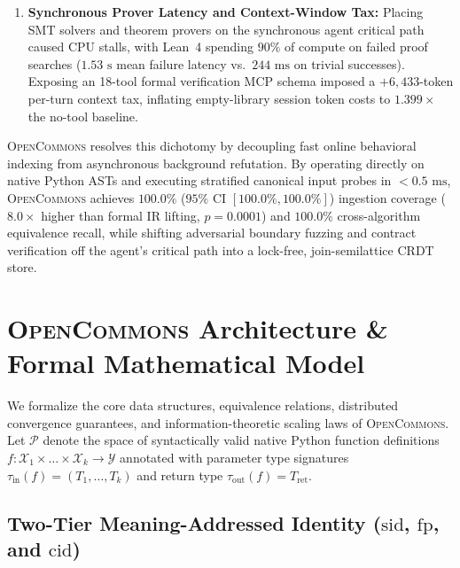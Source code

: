\documentclass[10pt,twocolumn]{article}
\begin{document}
\begin{enumerate}
    \item \textbf{Synchronous Prover Latency and Context-Window Tax:} Placing SMT solvers and theorem provers on the synchronous agent critical path caused CPU stalls, with Lean~4 spending $90\%$ of compute on failed proof searches ($1.53\text{ s}$ mean failure latency vs.\ $244\text{ ms}$ on trivial successes). Exposing an 18-tool formal verification MCP schema imposed a $+6{,}433$-token per-turn context tax, inflating empty-library session token costs to $1.399\times$ the no-tool baseline.
\end{enumerate}

\textsc{OpenCommons} resolves this dichotomy by decoupling fast online behavioral indexing from asynchronous background refutation. By operating directly on native Python ASTs and executing stratified canonical input probes in $<0.5\text{ ms}$, \textsc{OpenCommons} achieves $100.0\%$ ($95\%$ CI $[100.0\%, 100.0\%]$) ingestion coverage ($8.0\times$ higher than formal IR lifting, $p = 0.0001$) and $100.0\%$ cross-algorithm equivalence recall, while shifting adversarial boundary fuzzing and contract verification off the agent's critical path into a lock-free, join-semilattice CRDT store.

\section{\textsc{OpenCommons} Architecture \& Formal Mathematical Model}
\label{sec:formal_model}

We formalize the core data structures, equivalence relations, distributed convergence guarantees, and information-theoretic scaling laws of \textsc{OpenCommons}. Let $\mathcal{P}$ denote the space of syntactically valid native Python function definitions $f: \mathcal{X}_1 \times \dots \times \mathcal{X}_k \to \mathcal{Y}$ annotated with parameter type signatures $\tau_{\text{in}}(f) = (T_1, \dots, T_k)$ and return type $\tau_{\text{out}}(f) = T_{\text{ret}}$.

\subsection{Two-Tier Meaning-Addressed Identity ($\text{sid}$, $\text{fp}$, and $\text{cid}$)}
\end{document}
